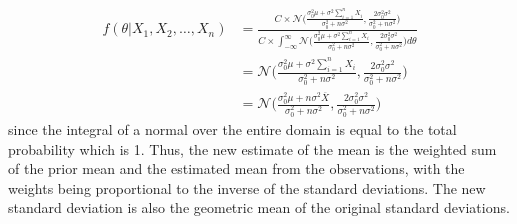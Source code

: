 \documentclass[../../probability-notes.tex]{subfiles}
\begin{document}
\begin{align*}
        f(\theta|X_{1}, X_{2}, \ldots, X_{n}) &= \frac{C \times \mathcal{N}\bigg(\frac{\sigma_{0}^{2} \mu + \sigma^{2}\sum_{i=1}^{n} X_{i}}{\sigma_{0}^{2} + n\sigma^{2}}, \frac{2\sigma_{0}^{2} \sigma^{2}}{\sigma_{0}^{2} + n\sigma^{2}}\bigg)}{C \times \int_{-\infty}^{\infty} \mathcal{N}\bigg(\frac{\sigma_{0}^{2} \mu + \sigma^{2}\sum_{i=1}^{n} X_{i}}{\sigma_{0}^{2} + n\sigma^{2}}, \frac{2\sigma_{0}^{2} \sigma^{2}}{\sigma_{0}^{2} + n\sigma^{2}}\bigg) d\theta}\\
        &= \mathcal{N}\bigg(\frac{\sigma_{0}^{2} \mu + \sigma^{2}\sum_{i=1}^{n} X_{i}}{\sigma_{0}^{2} + n\sigma^{2}}, \frac{2\sigma_{0}^{2} \sigma^{2}}{\sigma_{0}^{2} + n\sigma^{2}}\bigg)\\
        &= \mathcal{N}\bigg(\frac{\sigma_{0}^{2} \mu + n\sigma^{2}\overline{X}}{\sigma_{0}^{2} + n\sigma^{2}}, \frac{2\sigma_{0}^{2} \sigma^{2}}{\sigma_{0}^{2} + n\sigma^{2}}\bigg)
    \end{align*}
    since the integral of a normal over the entire domain is equal to the total probability which is 1. Thus, the new estimate of the mean is the weighted sum of the prior mean and the estimated mean from the observations, with the weights being proportional to the inverse of the standard deviations. The new standard deviation is also the geometric mean of the original standard deviations.
\end{document}
